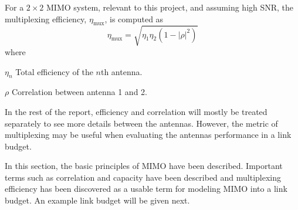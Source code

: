 For a $2\times2$ MIMO system, relevant to this project, and assuming high SNR, the multiplexing efficiency, $\eta_{\text{mux}}$, is computed as \cite{tian2011multiplexing}
\begin{equation} %
    \eta_{\text{mux}} = \sqrt{\eta_1 \eta_2 (1 - |\rho|^2)}
\end{equation}
where
\begin{where}
\item[$\eta_n$] Total efficiency of the $n$th antenna.
\item[$\rho$] Correlation between antenna 1 and 2.
\end{where}

In the rest of the report, efficiency and correlation will mostly be treated separately to see more details between the antennas. However, the metric of multiplexing may be useful when evaluating the antennas performance in a link budget.

\begin{aautail}
    In this section, the basic principles of MIMO have been described. Important terms such as correlation and capacity have been described and multiplexing efficiency has been discovered as a usable term for modeling MIMO into a link budget. An example link budget will be given next.
\end{aautail}
